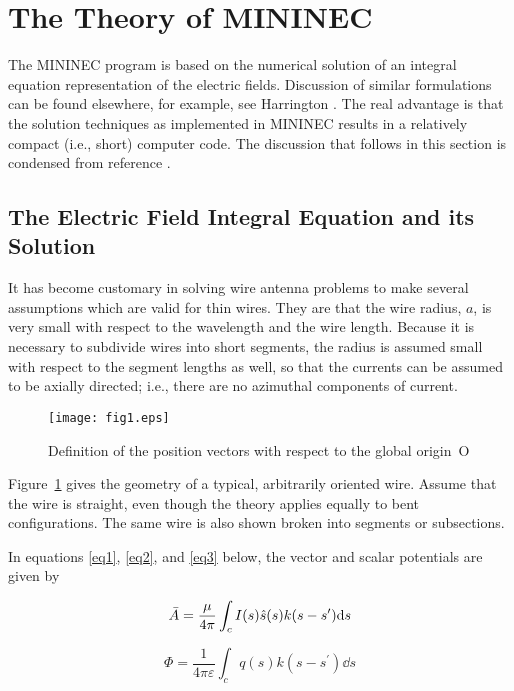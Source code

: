 \documentclass[12pt]{article}
\begin{document}
\section{The Theory of MININEC}
The MININEC program is based on the numerical solution of an integral
equation representation of the electric fields. Discussion of similar
formulations can be found elsewhere, for example, see Harrington
\cite{r5}. The real advantage is that the solution techniques as
implemented in MININEC results in a relatively compact (i.e., short)
computer code. The discussion that follows in this section is condensed
from reference \cite{r2}.

\subsection{The Electric Field Integral Equation and its Solution}
It has become customary in solving wire antenna problems to make several
assumptions which are valid for thin wires. They are that the wire
radius, $a$, is very small with respect to the wavelength and the wire
length. Because it is necessary to subdivide wires into short segments,
the radius is assumed small with respect to the segment lengths as well,
so that the currents can be assumed to be axially directed; i.e., there
are no azimuthal components of current.

\begin{figure}[htb]
\centerline{\texttt{[image: fig1.eps]}}
\caption{Definition of the position vectors with respect to the global
origin~O}
\label{fig1}
\end{figure}
\afterpage\clearpage

Figure~\ref{fig1} gives the geometry of a typical, arbitrarily oriented
wire. Assume that the wire is straight, even though the theory applies
equally to bent configurations. The same wire is also shown broken into
segments or subsections.

In equations \eqref{eq1}, \eqref{eq2}, and \eqref{eq3} below, the vector and
scalar potentials are given by

\begin{equation}
\bar{A} = \frac{\mu}{4\pi} \int_c I(s)\hat{s}(s)k(s-s^\prime)\mathrm{d}s
\label{eq1}
\end{equation}

\begin{equation}
\Phi = \frac{1}{4\pi\varepsilon} \int_c q(s)k(s-s^\prime)\dd{s}
\label{eq2}
\end{equation}
\end{document}
